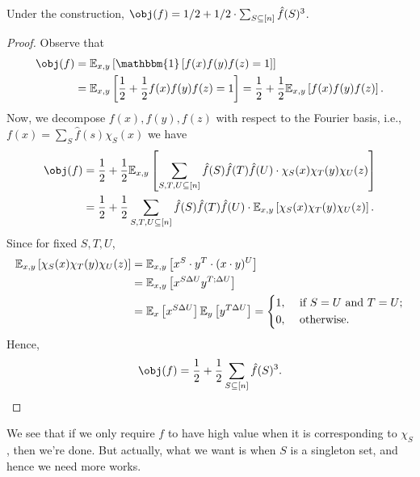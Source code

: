 \begin{theorem}[\cite{10.1145/100216.100225}]\label{thm:BLR}
	Under the construction, \(\obj(f) = 1 / 2 + 1 / 2 \cdot \sum_{S \subseteq [n]} \hat{f} (S)^3 \).
\end{theorem}
\begin{proof}
	Observe that
	\[
		\begin{split}
			\obj(f)
			 & = \mathbb{E}_{x, y}\left[\mathbbm{1}\left[ f(x)f(y)f(z) = 1 \right] \right] \\
			 & = \mathbb{E}_{x, y}\left[\frac{1}{2} + \frac{1}{2} f(x)f(y)f(z) = 1 \right]
			= \frac{1}{2} + \frac{1}{2} \mathbb{E}_{x, y}\left[f(x)f(y)f(z) \right].
		\end{split}
	\]
	Now, we decompose \(f(x), f(y), f(z)\) with respect to the Fourier basis, i.e., \(f(x) = \sum_{S} \hat{f} (s)\chi _S(x)\) we have
	\[
		\begin{split}
			\obj(f)
			 & = \frac{1}{2} + \frac{1}{2} \mathbb{E}_{x, y}\left[\sum_{S, T, U \subseteq [n]} \hat{f} (S)\hat{f} (T)\hat{f} (U) \cdot \chi _S(x) \chi _T(y) \chi _U(z)\right]  \\
			 & = \frac{1}{2} + \frac{1}{2} \sum_{S, T, U \subseteq [n]} \hat{f} (S)\hat{f} (T)\hat{f} (U) \cdot \mathbb{E}_{x, y}\left[\chi _S(x) \chi _T(y) \chi _U(z)\right].
		\end{split}
	\]
	Since for fixed \(S, T, U\),
	\[
		\begin{split}
			\mathbb{E}_{x, y}\left[\chi _S(x) \chi _T(y) \chi _U(z)\right]
			 & = \mathbb{E}_{x, y}\left[x^S\cdot y^T\cdot (x\cdot y)^U \right]                         \\
			 & = \mathbb{E}_{x, y}\left[x^{S \Delta U} y^{T;\Delta U} \right]                          \\
			 & = \mathbb{E}_{x}\left[x^{S \Delta U} \right] \mathbb{E}_{y}\left[y^{T \Delta U} \right]
			= \begin{dcases}
				  1, & \text{ if } S=U \text{ and } T=U ; \\
				  0, & \text{ otherwise} .
			  \end{dcases}
		\end{split}
	\]
	Hence,
	\[
		\obj(f)
		= \frac{1}{2} + \frac{1}{2} \sum_{S \subseteq [n]} \hat{f} (S)^3 .
	\]
\end{proof}

We see that if we only require \(f\) to have high value when it is corresponding to \(\chi _S\), then we're done. But actually, what we want is when \(S\) is a singleton set, and hence we need more works.

